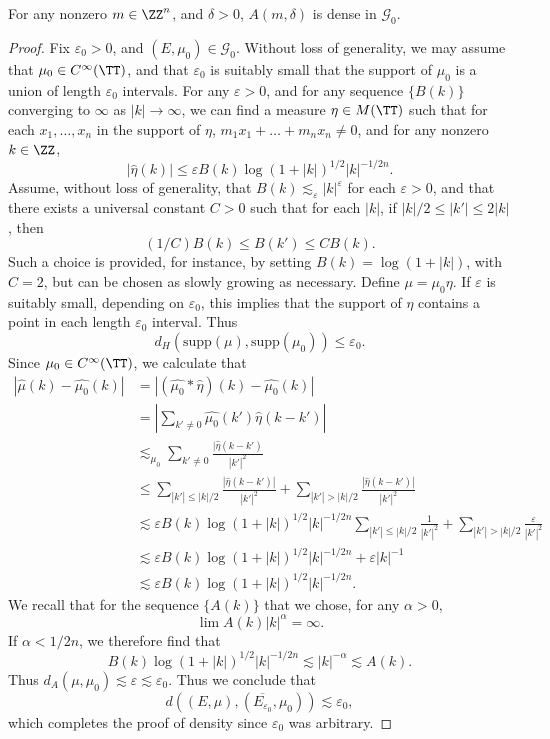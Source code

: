 \begin{lemma}
	For any nonzero $m \in \ZZ^n$, and $\delta > 0$, $A(m,\delta)$ is dense in $\mathcal{G}_0$.
\end{lemma}
\begin{proof}
	Fix $\varepsilon_0 > 0$, and $(E,\mu_0) \in \mathcal{G}_0$. Without loss of generality, we may assume that $\mu_0 \in C^\infty(\TT)$, and that $\varepsilon_0$ is suitably small that the support of $\mu_0$ is a union of length $\varepsilon_0$ intervals. For any $\varepsilon > 0$, and for any sequence $\{ B(k) \}$ converging to $\infty$ as $|k| \to \infty$, we can find a measure $\eta \in M(\TT)$ such that for each $x_1, \dots, x_n$ in the support of $\eta$, $m_1 x_1 + \dots + m_n x_n \neq 0$, and for any nonzero $k \in \ZZ$,
	\[ |\widehat{\eta}(k)| \leq \varepsilon B(k) \log(1 + |k|)^{1/2} |k|^{-1/2n}. \]
	Assume, without loss of generality, that $B(k) \lesssim_\varepsilon |k|^\varepsilon$ for each $\varepsilon > 0$, and that there exists a universal constant $C > 0$ such that for each $|k|$, if $|k|/2 \leq |k'| \leq 2 |k|$, then
	\[ (1/C) B(k) \leq B(k') \leq C B(k). \]
	Such a choice is provided, for instance, by setting $B(k) = \log(1 + |k|)$, with $C = 2$, but can be chosen as slowly growing as necessary. Define $\mu = \mu_0 \eta$. If $\varepsilon$ is suitably small, depending on $\varepsilon_0$, this implies that the support of $\eta$ contains a point in each length $\varepsilon_0$ interval. Thus
	\[ d_H(\text{supp}(\mu), \text{supp}(\mu_0)) \leq \varepsilon_0. \]
	Since $\mu_0 \in C^\infty(\TT)$, we calculate that
	\begin{align*}
		|\widehat{\mu}(k) - \widehat{\mu_0}(k)| &= \left| (\widehat{\mu_0} * \widehat{\eta})(k) - \widehat{\mu_0}(k) \right|\\
		&= \left| \sum_{k' \neq 0} \widehat{\mu_0}(k') \widehat{\eta}(k-k') \right|\\
		&\lesssim_{\mu_0} \sum_{k' \neq 0} \frac{|\widehat{\eta}(k-k')}{|k'|^2}\\
		&\leq \sum_{|k'| \leq |k|/2} \frac{|\widehat{\eta}(k-k')|}{|k'|^2} + \sum_{|k'| > |k|/2} \frac{|\widehat{\eta}(k-k')|}{|k'|^2}\\
		&\lesssim \varepsilon B(k) \log(1 + |k|)^{1/2} |k|^{-1/2n} \sum_{|k'| \leq |k|/2} \frac{1}{|k'|^2} + \sum_{|k'| > |k|/2} \frac{\varepsilon}{|k'|^2}\\
		&\lesssim \varepsilon B(k) \log(1 + |k|)^{1/2} |k|^{-1/2n} + \varepsilon |k|^{-1}\\
		&\lesssim \varepsilon B(k) \log(1 + |k|)^{1/2} |k|^{-1/2n}.
	\end{align*}
	We recall that for the sequence $\{ A(k) \}$ that we chose, for any $\alpha > 0$,
	\[ \lim A(k) |k|^\alpha = \infty. \]
	If $\alpha < 1/2n$, we therefore find that
	\[ B(k) \log(1 + |k|)^{1/2} |k|^{-1/2n} \lesssim |k|^{-\alpha} \lesssim A(k). \]
	Thus $d_A(\mu, \mu_0) \lesssim \varepsilon \lesssim \varepsilon_0$. Thus we conclude that
	\[ d((E,\mu),(\overline{E_{\varepsilon_0}},\mu_0)) \lesssim \varepsilon_0, \]
	which completes the proof of density since $\varepsilon_0$ was arbitrary.
\end{proof}

